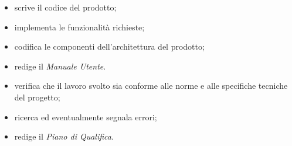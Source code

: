 \begin{itemize}
    \item scrive il codice del prodotto;
    \item implementa le funzionalità richieste;
    \item codifica le componenti dell'architettura del prodotto;
    \item redige il \textit{Manuale Utente}. 
\end{itemize}

\begin{itemize}
    \item verifica che il lavoro svolto sia conforme alle norme e alle specifiche tecniche del progetto;
    \item ricerca ed eventualmente segnala errori;
    \item redige il \textit{Piano di Qualifica}.
\end{itemize}


